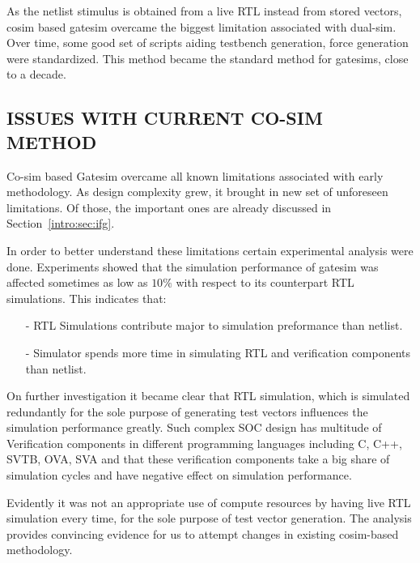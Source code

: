 As the netlist stimulus is obtained from a live RTL instead from stored vectors, cosim based gatesim overcame the biggest limitation associated with dual-sim. Over time, some good set of scripts aiding testbench generation, force generation were standardized. This method became the standard method for gatesims, close to a decade.

\subsection {ISSUES WITH CURRENT CO-SIM METHOD}

Co-sim based Gatesim overcame all known limitations associated with early methodology. As design complexity grew, it brought in new set of unforeseen limitations. Of those, the important ones are already discussed in Section~\ref{intro:sec:ifg}.

In order to better understand these limitations certain experimental analysis were done. Experiments showed that the simulation performance of gatesim was affected sometimes as low as $10\%$ with respect to its counterpart RTL simulations. This indicates that:

\begin{itemize}
	\item[-]RTL Simulations contribute major to simulation preformance than netlist.
	\item[-]Simulator spends more time in simulating RTL and verification components than netlist.
\end{itemize}

On further investigation it became clear that RTL simulation, which is simulated redundantly for the sole purpose of generating test vectors influences the simulation performance greatly. Such complex SOC design has multitude of Verification components in different programming languages including C, C++, SVTB, OVA, SVA and that these verification components take a big share of simulation cycles and have negative effect on simulation performance.

Evidently it was not an appropriate use of compute resources by having live RTL simulation every time, for the sole purpose of test vector generation. The analysis provides convincing evidence for us to attempt changes in existing cosim-based methodology.

